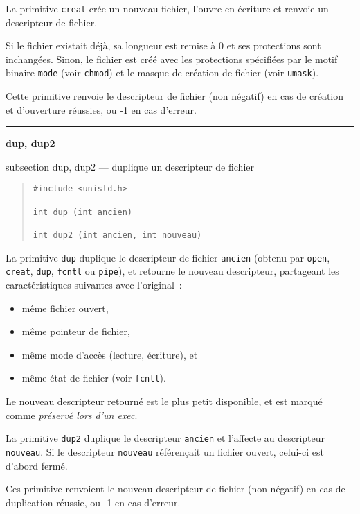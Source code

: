 \documentclass [twoside] {report}
\newcommand {\primitive} [1]
    {
	{\large \bf #1}
	\addcontentsline {toc} {subsection} {#1}
    }
\newcommand {\separation}
    {
	\vspace {7mm}
	\nopagebreak
	\hrule
    }
\begin{document}
La primitive {\tt creat} crée un nouveau fichier,
l'ouvre en écriture et renvoie un descripteur de
fichier.

Si le fichier existait déjà, sa longueur est
remise à 0 et ses protections sont inchangées.
Sinon, le fichier est créé avec les protections
spécifiées par le motif binaire {\tt mode} (voir
{\tt chmod}) et le masque de création de fichier
(voir {\tt umask}).

Cette primitive renvoie le descripteur de fichier
(non négatif) en cas de création et d'ouverture
réussies, ou -1 en cas d'erreur.




\separation
\primitive {dup, dup2} --- duplique un descripteur de fichier

\begin {quote}
\begin {verbatim}
#include <unistd.h>

int dup (int ancien)

int dup2 (int ancien, int nouveau)
\end{verbatim}
\end {quote}

La primitive {\tt dup} duplique le descripteur de
fichier {\tt ancien} (obtenu par {\tt open}, {\tt creat},
{\tt dup}, {\tt fcntl} ou {\tt pipe}), et retourne le
nouveau descripteur, partageant les
caractéristiques suivantes avec l'original~:

\begin {itemize}
    \item même fichier ouvert,
    \item même pointeur de fichier,
    \item même mode d'accès (lecture, écriture), et
    \item même état de fichier (voir {\tt fcntl}).
\end {itemize}

Le nouveau descripteur retourné est le plus petit
disponible, et est marqué comme {\it préservé lors
d'un exec}.

La primitive {\tt dup2} duplique le descripteur {\tt ancien} et
l'affecte au descripteur {\tt nouveau}. Si le descripteur {\tt nouveau}
référençait un fichier ouvert, celui-ci est d'abord fermé.

Ces primitive renvoient le nouveau descripteur de fichier
(non négatif) en cas de duplication
réussie, ou -1 en cas d'erreur.
\end{document}

